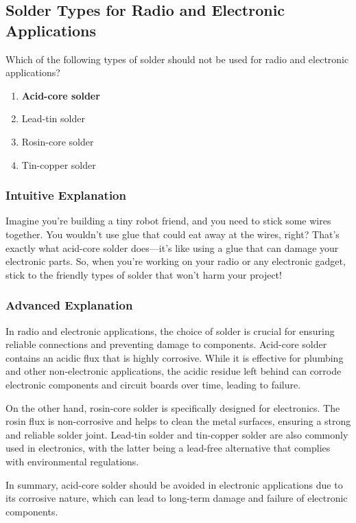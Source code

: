 \subsection{Solder Types for Radio and Electronic Applications}
\label{T7D08}

\begin{tcolorbox}[colback=gray!10!white,colframe=black!75!black,title=T7D08]
Which of the following types of solder should not be used for radio and electronic applications?
\begin{enumerate}[label=\Alph*)]
    \item \textbf{Acid-core solder}
    \item Lead-tin solder
    \item Rosin-core solder
    \item Tin-copper solder
\end{enumerate}
\end{tcolorbox}

\subsubsection{Intuitive Explanation}
Imagine you're building a tiny robot friend, and you need to stick some wires together. You wouldn't use glue that could eat away at the wires, right? That's exactly what acid-core solder does—it's like using a glue that can damage your electronic parts. So, when you're working on your radio or any electronic gadget, stick to the friendly types of solder that won't harm your project!

\subsubsection{Advanced Explanation}
In radio and electronic applications, the choice of solder is crucial for ensuring reliable connections and preventing damage to components. Acid-core solder contains an acidic flux that is highly corrosive. While it is effective for plumbing and other non-electronic applications, the acidic residue left behind can corrode electronic components and circuit boards over time, leading to failure.

On the other hand, rosin-core solder is specifically designed for electronics. The rosin flux is non-corrosive and helps to clean the metal surfaces, ensuring a strong and reliable solder joint. Lead-tin solder and tin-copper solder are also commonly used in electronics, with the latter being a lead-free alternative that complies with environmental regulations.

In summary, acid-core solder should be avoided in electronic applications due to its corrosive nature, which can lead to long-term damage and failure of electronic components.

